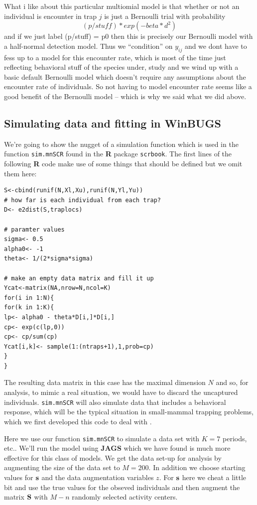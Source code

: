 {What i like about this particular multiomial model is that whether or not
an individual is encounter in trap $j$ is just a Bernoulli trial with
probability
\[ 
(p/stuff)*exp(-beta*d^2)
\]
and if we just label (p/stuff) = p0 then this is precisely our
Bernoulli model with a half-normal detection model.  Thus we ``condition''
on $y_{ij}$ and we dont have to fess up to a model for this encounter
rate, which is most of the time just reflecting behavioral stuff of the
species under, study and we wind up with a basic default Bernoulli model
which doesn't require any assumptions about the encounter rate of 
individuals.  So not having to model encounter rate seems like a good
benefit of the Bernoulli model -- which is why we said what we did above.


\subsection{Simulating data and fitting in WinBUGS}

We're going to show the nugget of a simulation function which is
used in the function \mbox{\tt sim.mnSCR} found in the {\bf R} package
\mbox{\tt scrbook}.  The first lines of the following {\bf R} code
make use of some things that should be defined but we omit them here:
{\small
\begin{verbatim}
S<-cbind(runif(N,Xl,Xu),runif(N,Yl,Yu))
# how far is each individual from each trap?
D<- e2dist(S,traplocs)

# paramter values
sigma<- 0.5
alpha0<- -1
theta<- 1/(2*sigma*sigma)

# make an empty data matrix and fill it up
Ycat<-matrix(NA,nrow=N,ncol=K)
for(i in 1:N){
for(k in 1:K){
lp<- alpha0 - theta*D[i,]*D[i,]
cp<- exp(c(lp,0))
cp<- cp/sum(cp)
Ycat[i,k]<- sample(1:(ntraps+1),1,prob=cp)
}
}
\end{verbatim}
}
The resulting data matrix in this case has the maximal dimension $N$
and so, for analysis, to mimic a real situation, we would have to discard the uncaptured
individuals. 
\mbox{\tt sim.mnSCR} will also simulate data that includes a
behavioral response, which will be the typical situation in
small-mammal trapping problems, which we first developed this code to
deal with \citep[see][for details]{converse_royle:2012}.

Here we use our function \mbox{\tt sim.mnSCR} to simulate a data set
with $K=7$ periods, etc.. We'll run the model using {\bf JAGS} which we
have found is much more effective for this class of models.
We get the data set-up for analysis by augmenting the size of the data
set to $M=200$. In addition we choose starting values for ${\bf s}$ and the
data augmentation variables $z$.  For ${\bf s}$ here we cheat a little bit
and use the true values for the obseved individuals and then augment
the matrix ${\bf S}$ with $M-n$ randomly selected activity centers.

}
